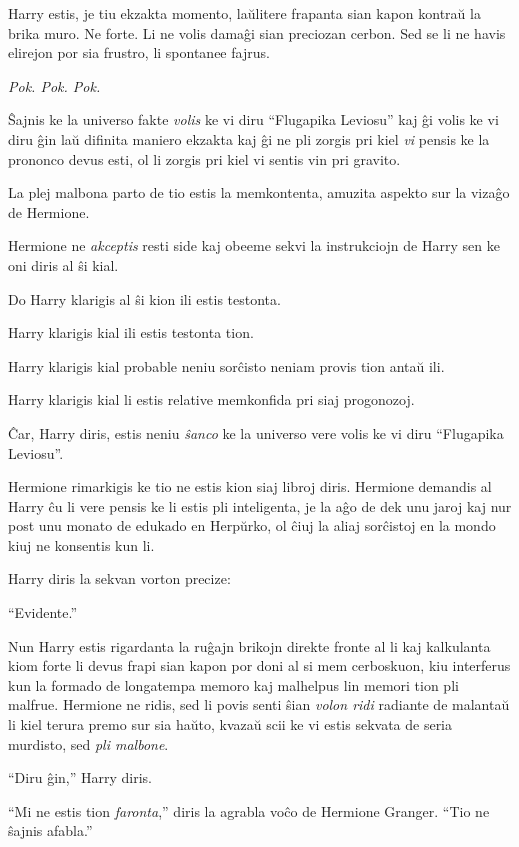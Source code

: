 Harry estis, je tiu ekzakta momento, laŭlitere frapanta sian kapon
kontraŭ la brika muro. Ne forte. Li ne volis damaĝi sian preciozan
cerbon. Sed se li ne havis elirejon por sia frustro, li spontanee
fajrus.

\emph{Pok. Pok. Pok.}

Ŝajnis ke la universo fakte \emph{volis} ke vi diru ``Flugapika
Leviosu'' kaj ĝi volis ke vi diru ĝin laŭ difinita maniero ekzakta kaj
ĝi ne pli zorgis pri kiel \emph{vi} pensis ke la prononco devus esti,
ol li zorgis pri kiel vi sentis vin pri gravito.

\emph{}

La plej malbona parto de tio estis la memkontenta, amuzita aspekto sur
la vizaĝo de Hermione.

Hermione ne \emph{akceptis} resti side kaj obeeme sekvi la instrukciojn
de Harry sen ke oni diris al ŝi kial.

Do Harry klarigis al ŝi kion ili estis testonta.

Harry klarigis kial ili estis testonta tion.

Harry klarigis kial probable neniu sorĉisto neniam provis tion antaŭ ili.

Harry klarigis kial li estis relative memkonfida pri siaj progonozoj.

Ĉar, Harry diris, estis neniu \emph{ŝanco} ke la universo vere volis ke vi diru ``Flugapika Leviosu''.

Hermione rimarkigis ke tio ne estis kion siaj libroj diris. Hermione
demandis al Harry ĉu li vere pensis ke li estis pli inteligenta, je la
aĝo de dek unu jaroj kaj nur post unu monato de edukado en Herpŭrko,
ol ĉiuj la aliaj sorĉistoj en la mondo kiuj ne konsentis kun li.

Harry diris la sekvan vorton precize:

``Evidente.''

Nun Harry estis rigardanta la ruĝajn brikojn direkte fronte al li kaj
kalkulanta kiom forte li devus frapi sian kapon por doni al si mem
cerboskuon, kiu interferus kun la formado de longatempa memoro kaj
malhelpus lin memori tion pli malfrue. Hermione ne ridis, sed li povis
senti ŝian \emph{volon ridi} radiante de malantaŭ li kiel terura premo
sur sia haŭto, kvazaŭ scii ke vi estis sekvata de seria murdisto, sed
\emph{pli malbone}.

``Diru ĝin,'' Harry diris.

``Mi ne estis tion \emph{faronta},'' diris la agrabla voĉo de Hermione
Granger. ``Tio ne ŝajnis afabla.''

